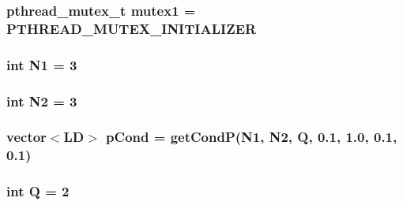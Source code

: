 \subsubsection{\setlength{\rightskip}{0pt plus 5cm}pthread\_\-mutex\_\-t {\bf mutex1} = PTHREAD\_\-MUTEX\_\-INITIALIZER}\label{Porig_8cpp_b923000c9ea1e2fe4231ea2ba1b18533}


\subsubsection{\setlength{\rightskip}{0pt plus 5cm}int {\bf N1} = 3}\label{Porig_8cpp_2ab3914715aa73894201a73724e23eaf}


\subsubsection{\setlength{\rightskip}{0pt plus 5cm}int {\bf N2} = 3}\label{Porig_8cpp_eeb0b34c6bb5c0808e6adcb9b24a60f1}


\subsubsection{\setlength{\rightskip}{0pt plus 5cm}vector$<${\bf LD}$>$ {\bf pCond} = getCondP({\bf N1}, {\bf N2}, {\bf Q}, 0.1, 1.0, 0.1, 0.1)}\label{Porig_8cpp_291b1c1f446e04240a8efd0eba4078c6}


\subsubsection{\setlength{\rightskip}{0pt plus 5cm}int {\bf Q} = 2}\label{Porig_8cpp_cc466dc72258615e76456288d8631a00}


